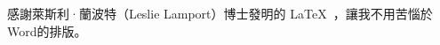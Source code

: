 \begin{acknowledgementszh}

感謝萊斯利·蘭波特（Leslie Lamport）博士發明的 \LaTeX\ ，讓我不用苦惱於Word的排版。

\end{acknowledgementszh}


